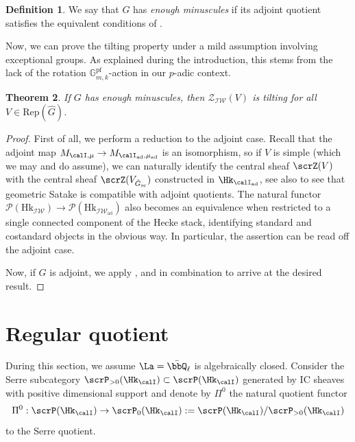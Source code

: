 \documentclass[10pt, reqno]{amsart}
\theoremstyle{plain}
\newtheorem{theorem}{Theorem}[section]
\theoremstyle{definition}
\newtheorem{definition}[theorem]{Definition}
\numberwithin{equation}{section}
\begin{document}
\begin{definition}\label{def_enough_minusc}
	We say that $G$ has {\it enough minuscules} if its adjoint quotient satisfies the equivalent conditions of .
\end{definition}

Now, we can prove the tilting property under a mild assumption involving exceptional groups. As explained during the introduction, this stems from the lack of the rotation $\mathbb{G}_{m,k}^{\mathrm{pf}}$-action in our $p$-adic context.

\begin{theorem}\label{thm_tilting}
	If $G$ has enough minuscules, then $\mathscr{Z}_{\mathcal{I}\mathcal{W}}(V)$ is tilting for all $V \in \mathrm{Rep}(\hat{G})$.
\end{theorem}

\begin{proof}
	First of all, we perform a reduction to the adjoint case. Recall that the adjoint map $M_{\calI,\mu}\to M_{\calI_{\mathrm{ad}},\mu_{\mathrm{ad}}}$ is an isomorphism, so if $V$ is simple (which we may and do assume), we can naturally identify the central sheaf $\scrZ(V)$ with the central sheaf $\scrZ(V_{\hat{G}_{\mathrm{sc}}})$ constructed in $\Hk_{\calI_{\mathrm{ad}}}$, see also \cite[Section VI.11]{FS21} to see that geometric Satake is compatible with adjoint quotients. The natural functor $\mathscr{P}(\mathrm{Hk}_{\mathcal{I}\mathcal{W}})\to \mathscr{P}(\mathrm{Hk}_{\mathcal{I}\mathcal{W}_{\mathrm{ad}}})$ also becomes an equivalence when restricted to a single connected component of the Hecke stack, identifying standard and costandard objects in the obvious way. In particular, the assertion can be read off the adjoint case.
	
	Now, if $G$ is adjoint, we apply ,  and  in combination to arrive at the desired result.
\end{proof}
\section{Regular quotient}
During this section, we assume $\La=\bar \bbQ_\ell$ is algebraically closed. Consider the Serre subcategory $\scrP_{>0}(\Hk_{\calI}) \subset \scrP(\Hk_{\calI})$ generated by IC sheaves with positive dimensional support and denote by $\Pi^0$ the natural quotient functor  
\begin{equation}
	\label{eq:2-functor-pi-0}
	\Pi^0: \scrP(\Hk_{\calI})\rightarrow \scrP_0(\Hk_{\calI}):=\scrP(\Hk_{\calI})/\scrP_{>0}(\Hk_{\calI})
\end{equation}
to the Serre quotient. 
\end{document}
